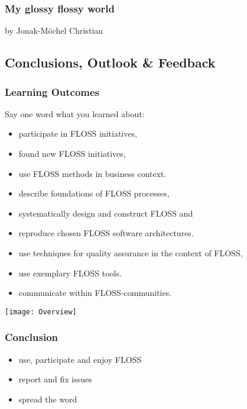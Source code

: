 \breakframe

\begin{frame}
	\frametitle{My glossy flossy world}

	by Jonak-Möchel Christian
\end{frame}

\subsection{Conclusions, Outlook \& Feedback}

\begin{frame}
	\frametitle{Learning Outcomes}

	Say one word what you learned about:

	\begin{itemize}[<+-| alert@+>]
	\item participate in FLOSS initiatives,
	\item found new FLOSS initiatives,
	\item use FLOSS methods in business context.

	\item describe foundations of FLOSS processes,
	\item systematically design and construct FLOSS and
	\item reproduce chosen FLOSS software architectures.

	\item use techniques for quality assurance in the context of FLOSS,
	\item use exemplary FLOSS tools.

	\item communicate within FLOSS-communities.
	\end{itemize}
\end{frame}

\begin{frame}
	\texttt{[image: Overview]}
\end{frame}

\begin{frame}
	\frametitle{Conclusion}

	\begin{itemize}[<+-| alert@+>]
	\item use, participate and enjoy FLOSS
	\item report and fix issues
	\item spread the word
	\end{itemize}
\end{frame}

